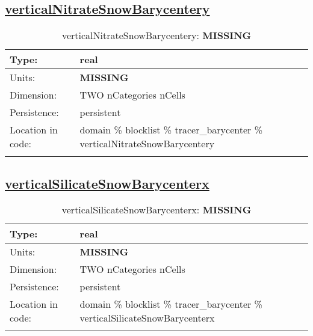 \subsection[verticalNitrateSnowBarycentery]{\hyperref[sec:var_tab_tracer_barycenter]{verticalNitrateSnowBarycentery}}
\label{subsec:var_sec_tracer_barycenter_verticalNitrateSnowBarycentery}
\begin{center}
\begin{longtable}{| p{2.0in} | p{4.0in} |}
        \hline 
        Type: & real \\
        \hline 
        Units: & {\bf \color{red} MISSING} \\
        \hline 
        Dimension: & TWO nCategories nCells \\
        \hline 
        Persistence: & persistent \\
        \hline 
         Location in code: & domain \% blocklist \% tracer\_barycenter \% verticalNitrateSnowBarycentery \\
         \hline 
    \caption{verticalNitrateSnowBarycentery: {\bf \color{red} MISSING}}
\end{longtable}
\end{center}
\subsection[verticalSilicateSnowBarycenterx]{\hyperref[sec:var_tab_tracer_barycenter]{verticalSilicateSnowBarycenterx}}
\label{subsec:var_sec_tracer_barycenter_verticalSilicateSnowBarycenterx}
\begin{center}
\begin{longtable}{| p{2.0in} | p{4.0in} |}
        \hline 
        Type: & real \\
        \hline 
        Units: & {\bf \color{red} MISSING} \\
        \hline 
        Dimension: & TWO nCategories nCells \\
        \hline 
        Persistence: & persistent \\
        \hline 
         Location in code: & domain \% blocklist \% tracer\_barycenter \% verticalSilicateSnowBarycenterx \\
         \hline 
    \caption{verticalSilicateSnowBarycenterx: {\bf \color{red} MISSING}}
\end{longtable}
\end{center}
